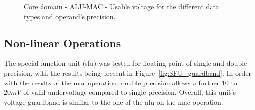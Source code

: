 
\begin{figure}[!htb]
    \centering
    \begin{subfigmatrix}{2}
      \label{fig:MAC_guardband}
    \end{subfigmatrix}
    \caption{Core domain - ALU-MAC - Usable voltage for the different data types and operand's precision.}
\end{figure}

\clearpage

\subsection{Non-linear Operations}

The special function unit (\acrshort{sfu}) was tested for floating-point of single and double-precision, with the results being present in Figure~\ref{fig:SFU_guardband}. In order with the results of the \acrshort{mac} operation, double precision allows a further $10$ to $20mV$ of valid undervoltage compared to single precision. Overall, this unit's voltage guardband is similar to the one of the \acrshort{alu} on the \acrshort{mac} operation. 



